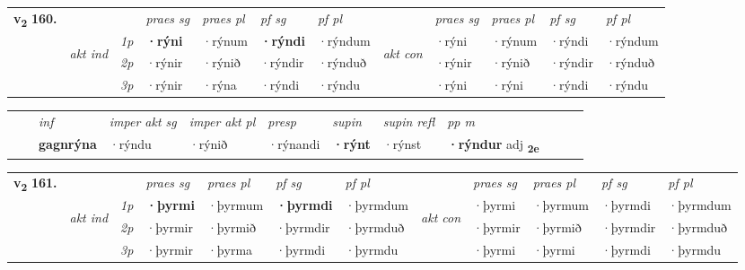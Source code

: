 \begin{tabular}{llllllllllll} \toprule
\multirow{4}{*}{{{\textbf{v{\textsubscript{2}}} \Large{\textbf{160.}}}}}  & &   &  \textit{praes sg}  & \textit{praes pl}  &\textit{ pf sg} & \textit{pf pl} &  &  \textit{praes sg}  & \textit{praes pl}  & \textit{pf sg} & \textit{pf pl } \\*
	\cmidrule{4-7} \cmidrule{9-12}
 & \multirow{3}{*}{\begin{turn}{90}\textit{akt ind}\end{turn}} & {\textit{1p}} & \textbf{·rýni} & ·rýnum    & \textbf{·rýndi} & ·rýndum & \multirow{3}{*}{\begin{turn}{90}\textit{akt con}\end{turn}} &·rýni & ·rýnum & ·rýndi & ·rýndum\\*
& &  {\textit{2p}} &  ·rýnir  & ·rýnið   & ·rýndir & ·rýnduð & & ·rýnir & ·rýnið & ·rýndir & ·rýnduð \\*
& &  {\textit{3p}} & ·rýnir & ·rýna   & ·rýndi & ·rýndu & & ·rýni & ·rýni& ·rýndi & ·rýndu  \\*
\cmidrule{4-7} \cmidrule{9-12}
\end{tabular}


\begin{tabular}{llllllllllll}
 & & \textit{inf} & \textit{imper akt sg} & \textit{imper akt pl}   & \textit{presp} & \textit{supin} & \textit{supin refl} & \textit{pp m}     \\*
  & & \textbf{gagnrýna} & ·rýndu  & ·rýnið   & ·rýnandi &  \textbf{·rýnt} & ·rýnst & \textbf{·rýndur} adj \textbf{\textsubscript{2e}} \\*
\cmidrule{1-12}
\end{tabular}



\begin{tabular}{llllllllllll} \toprule
\multirow{4}{*}{{{\textbf{v{\textsubscript{2}}} \Large{\textbf{161.}}}}}  & &   &  \textit{praes sg}  & \textit{praes pl}  &\textit{ pf sg} & \textit{pf pl} &  &  \textit{praes sg}  & \textit{praes pl}  & \textit{pf sg} & \textit{pf pl } \\*
	\cmidrule{4-7} \cmidrule{9-12}
 & \multirow{3}{*}{\begin{turn}{90}\textit{akt ind}\end{turn}} & {\textit{1p}} & \textbf{·þyrmi} & ·þyrmum    & \textbf{·þyrmdi} & ·þyrmdum & \multirow{3}{*}{\begin{turn}{90}\textit{akt con}\end{turn}} &·þyrmi & ·þyrmum & ·þyrmdi & ·þyrmdum\\*
& &  {\textit{2p}} &  ·þyrmir  & ·þyrmið   & ·þyrmdir & ·þyrmduð & & ·þyrmir & ·þyrmið & ·þyrmdir & ·þyrmduð \\*
& &  {\textit{3p}} & ·þyrmir & ·þyrma   & ·þyrmdi & ·þyrmdu & & ·þyrmi & ·þyrmi& ·þyrmdi & ·þyrmdu  \\*
\cmidrule{4-7} \cmidrule{9-12}
\end{tabular}


